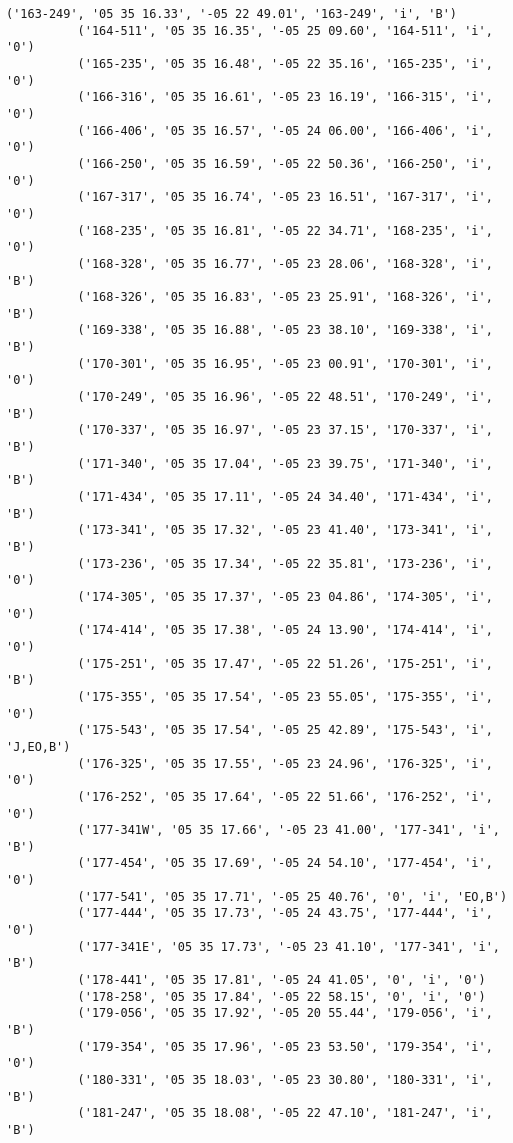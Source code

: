 \documentclass{article}
\begin{document}
\begin{Verbatim}[commandchars=\\\{\}]
          ('163-249', '05 35 16.33', '-05 22 49.01', '163-249', 'i', 'B')
          ('164-511', '05 35 16.35', '-05 25 09.60', '164-511', 'i', '0')
          ('165-235', '05 35 16.48', '-05 22 35.16', '165-235', 'i', '0')
          ('166-316', '05 35 16.61', '-05 23 16.19', '166-315', 'i', '0')
          ('166-406', '05 35 16.57', '-05 24 06.00', '166-406', 'i', '0')
          ('166-250', '05 35 16.59', '-05 22 50.36', '166-250', 'i', '0')
          ('167-317', '05 35 16.74', '-05 23 16.51', '167-317', 'i', '0')
          ('168-235', '05 35 16.81', '-05 22 34.71', '168-235', 'i', '0')
          ('168-328', '05 35 16.77', '-05 23 28.06', '168-328', 'i', 'B')
          ('168-326', '05 35 16.83', '-05 23 25.91', '168-326', 'i', 'B')
          ('169-338', '05 35 16.88', '-05 23 38.10', '169-338', 'i', 'B')
          ('170-301', '05 35 16.95', '-05 23 00.91', '170-301', 'i', '0')
          ('170-249', '05 35 16.96', '-05 22 48.51', '170-249', 'i', 'B')
          ('170-337', '05 35 16.97', '-05 23 37.15', '170-337', 'i', 'B')
          ('171-340', '05 35 17.04', '-05 23 39.75', '171-340', 'i', 'B')
          ('171-434', '05 35 17.11', '-05 24 34.40', '171-434', 'i', 'B')
          ('173-341', '05 35 17.32', '-05 23 41.40', '173-341', 'i', 'B')
          ('173-236', '05 35 17.34', '-05 22 35.81', '173-236', 'i', '0')
          ('174-305', '05 35 17.37', '-05 23 04.86', '174-305', 'i', '0')
          ('174-414', '05 35 17.38', '-05 24 13.90', '174-414', 'i', '0')
          ('175-251', '05 35 17.47', '-05 22 51.26', '175-251', 'i', 'B')
          ('175-355', '05 35 17.54', '-05 23 55.05', '175-355', 'i', '0')
          ('175-543', '05 35 17.54', '-05 25 42.89', '175-543', 'i', 'J,EO,B')
          ('176-325', '05 35 17.55', '-05 23 24.96', '176-325', 'i', '0')
          ('176-252', '05 35 17.64', '-05 22 51.66', '176-252', 'i', '0')
          ('177-341W', '05 35 17.66', '-05 23 41.00', '177-341', 'i', 'B')
          ('177-454', '05 35 17.69', '-05 24 54.10', '177-454', 'i', '0')
          ('177-541', '05 35 17.71', '-05 25 40.76', '0', 'i', 'EO,B')
          ('177-444', '05 35 17.73', '-05 24 43.75', '177-444', 'i', '0')
          ('177-341E', '05 35 17.73', '-05 23 41.10', '177-341', 'i', 'B')
          ('178-441', '05 35 17.81', '-05 24 41.05', '0', 'i', '0')
          ('178-258', '05 35 17.84', '-05 22 58.15', '0', 'i', '0')
          ('179-056', '05 35 17.92', '-05 20 55.44', '179-056', 'i', 'B')
          ('179-354', '05 35 17.96', '-05 23 53.50', '179-354', 'i', '0')
          ('180-331', '05 35 18.03', '-05 23 30.80', '180-331', 'i', 'B')
          ('181-247', '05 35 18.08', '-05 22 47.10', '181-247', 'i', 'B')

\end{Verbatim}
\end{document}
